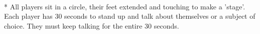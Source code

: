 \begin{minipage}{\textwidth}
\\*
All players sit in a circle, their feet extended and touching to make a 'stage'.  Each player has 30 seconds to stand up and talk about themselves or a subject of choice.  They must keep talking for the entire 30 seconds.
\end{minipage}    \vfill
